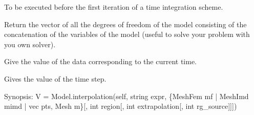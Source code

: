 \documentclass[a4paper,11pt,english]{sphinxmanual}
\begin{document}
\begin{fulllineitems}
\begin{fulllineitems}
\end{fulllineitems}


\begin{fulllineitems}
\label{\detokenize{python/cmdref_Model:getfem.Model.first_iter}}
To be executed before the first iteration of a time integration
scheme.

\end{fulllineitems}


\begin{fulllineitems}
\label{\detokenize{python/cmdref_Model:getfem.Model.from_variables}}
Return the vector of all the degrees of freedom of the model consisting
of the concatenation of the variables of the model (useful
to solve your problem with you own solver).

\end{fulllineitems}


\begin{fulllineitems}
\label{\detokenize{python/cmdref_Model:getfem.Model.get_time}}
Give the value of the data  corresponding to the current time.

\end{fulllineitems}


\begin{fulllineitems}
\label{\detokenize{python/cmdref_Model:getfem.Model.get_time_step}}
Gives the value of the time step.

\end{fulllineitems}


\begin{fulllineitems}
\label{\detokenize{python/cmdref_Model:getfem.Model.interpolation}}
Synopsis: V = Model.interpolation(self, string expr, \{MeshFem mf | MeshImd mimd | vec pts,  Mesh m\}{[}, int region{[}, int extrapolation{[}, int rg\_source{]}{]}{]})


\end{fulllineitems}
\end{fulllineitems}
\end{document}
